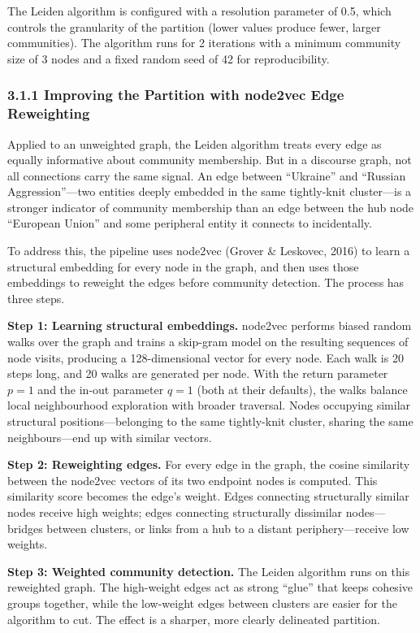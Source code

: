 \documentclass[11pt]{article}
\begin{document}
The Leiden algorithm is configured with a resolution parameter of 0.5, which controls the granularity of the partition (lower values produce fewer, larger communities). The algorithm runs for 2 iterations with a minimum community size of 3 nodes and a fixed random seed of 42 for reproducibility.

\subsubsection{3.1.1 Improving the Partition with node2vec Edge Reweighting}

Applied to an unweighted graph, the Leiden algorithm treats every edge as equally informative about community membership. But in a discourse graph, not all connections carry the same signal. An edge between ``Ukraine'' and ``Russian Aggression''---two entities deeply embedded in the same tightly-knit cluster---is a stronger indicator of community membership than an edge between the hub node ``European Union'' and some peripheral entity it connects to incidentally.

To address this, the pipeline uses node2vec (Grover \& Leskovec, 2016) to learn a structural embedding for every node in the graph, and then uses those embeddings to reweight the edges before community detection. The process has three steps.

\textbf{Step 1: Learning structural embeddings.} node2vec performs biased random walks over the graph and trains a skip-gram model on the resulting sequences of node visits, producing a 128-dimensional vector for every node. Each walk is 20 steps long, and 20 walks are generated per node. With the return parameter $p = 1$ and the in-out parameter $q = 1$ (both at their defaults), the walks balance local neighbourhood exploration with broader traversal. Nodes occupying similar structural positions---belonging to the same tightly-knit cluster, sharing the same neighbours---end up with similar vectors.

\textbf{Step 2: Reweighting edges.} For every edge in the graph, the cosine similarity between the node2vec vectors of its two endpoint nodes is computed. This similarity score becomes the edge's weight. Edges connecting structurally similar nodes receive high weights; edges connecting structurally dissimilar nodes---bridges between clusters, or links from a hub to a distant periphery---receive low weights.

\textbf{Step 3: Weighted community detection.} The Leiden algorithm runs on this reweighted graph. The high-weight edges act as strong ``glue'' that keeps cohesive groups together, while the low-weight edges between clusters are easier for the algorithm to cut. The effect is a sharper, more clearly delineated partition.
\end{document}
